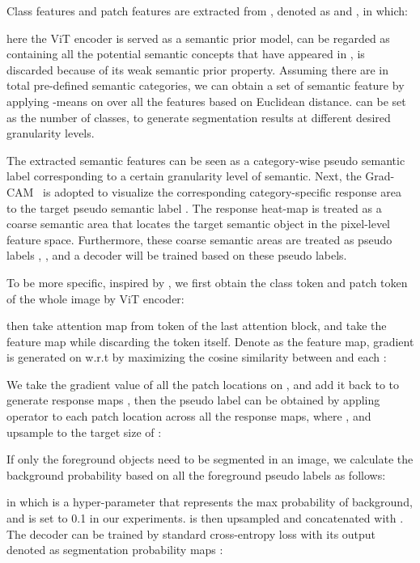 \documentclass[runningheads]{llncs}
\begin{document}
Class features and patch features are extracted from , denoted as  and  , in which:

here the ViT encoder is served as a semantic prior model,  can be regarded as containing all the potential semantic concepts that have appeared in ,  is discarded because of its weak semantic prior property. Assuming there are in total  pre-defined semantic categories, we can obtain  a set of semantic feature  by applying -means on  over all the  features based on Euclidean distance.  can be set as the number of classes, to generate segmentation results at different desired granularity levels.

The extracted semantic features  can be seen as a category-wise pseudo semantic label corresponding to a certain granularity level of semantic. Next, the Grad-CAM~\cite{selvaraju2017gradcam} is adopted to visualize the corresponding category-specific response area to the target pseudo semantic label . The response heat-map is treated as a coarse semantic area that locates the target semantic object in the pixel-level feature space. Furthermore, these coarse semantic areas are treated as pseudo labels , , and a decoder will be trained based on these pseudo labels.


To be more specific, inspired by \cite{chefer2021TransformerExplainability}, we first obtain the class token  and patch token  of the whole image  by ViT encoder:

then take attention map from  token of the last attention block, and take the feature map while discarding the  token itself. Denote  as the feature map,  gradient is generated on  w.r.t  by maximizing the cosine similarity between  and each :

We take the gradient value of all the patch locations on , and add it back to  to generate  response maps , then the pseudo label  can be obtained by appling  operator to each patch location  across all the  response maps, where , and upsample to the target size of :

If only the foreground objects need to be segmented in an image, we calculate the background probability   based on all the foreground pseudo labels as follows:

in which  is a hyper-parameter that represents the max probability of background, and is set to 0.1 in our experiments.  is then upsampled and concatenated with . 
The decoder can be trained by standard cross-entropy loss with its output denoted as segmentation probability maps :
\end{document}
